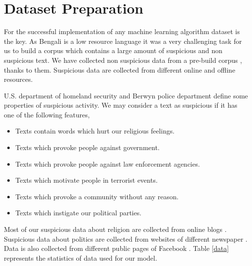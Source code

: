 \section{\textbf{Dataset Preparation}}
For the successful implementation of any machine learning algorithm dataset is the key. As Bengali is a low resource language it was a very challenging task for us to build a corpus which contains a large amount of suspicious and non suspicious text. We have collected non suspicious data from a pre-build corpus \cite{banglacorpus}, thanks to them. Suspicious data are collected from different online and offline resources.%
\par \vspace{0.3cm} 
\noindent
U.S. department of homeland security \cite{homesc} and Berwyn police department \cite{bpd} define some properties of suspicious activity. We may consider a text as suspicious if it has one of the following features,
\begin{itemize}
    \item Texts contain words which hurt our religious feelings.\vspace{0.2cm} 
    \item Texts which provoke people against government.\vspace{0.2cm} 
    \item Texts which provoke people against law enforcement agencies.\vspace{0.2cm} 
    \item Texts which motivate people in terrorist events.\vspace{0.2cm} 
    \item Texts which provoke a community without any reason.\vspace{0.2cm} 
    \item Texts which instigate our political parties. 
\end{itemize}
 \par \vspace{0.3cm}
 \noindent
 Most of our suspicious data about religion are collected from online blogs \cite{nastikya, dhormo, istishon}. Suspicious data about politics are collected from websites of different newspaper \cite{palo, kk, juga}. Data is also collected from different public pages of Facebook \cite{bash}. Table \ref{data} represents the statistics of data used for our model.
 
